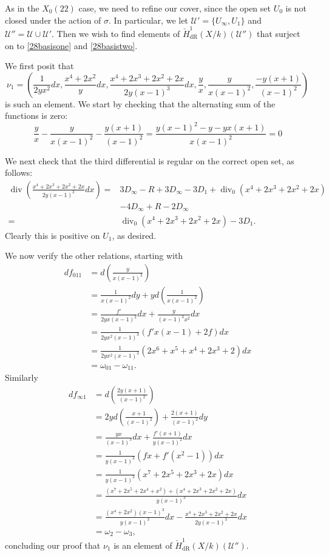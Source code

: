 \documentclass[draft, 11pt]{article} %
\theoremstyle{plain}
\theoremstyle{remark}
\newcommand{\cU}{{\mathcal U}}
\newcommand{\cechderhamhone}{\check{H}_{\text {dR}}^1(X/k)}
\DeclareMathOperator{\di}{div}
\begin{document}
As in the $X_0(22)$ case, we need to refine our cover, since the open set $U_0$ is not closed under the action of $\sigma$.
In particular, we let $\cU' = \{U_\infty, U_{1} \}$ and $\cU'' = \cU \cup \cU'$.
Then we wish to find elements of $\cechderhamhone(\cU'')$ that surject on to \eqref{28basisone} and \eqref{28basistwo}.

We first posit that
\[
\nu_1 = \left( \frac{1}{2yx^2}dx, \frac{x^4+2x^2}{y}dx, \frac{x^4 + 2x^3 + 2x^2 + 2x}{2y(x-1)^3}dx, \frac{y}{x}, \frac{y}{x(x-1)^2}, \frac{-y(x+1)}{(x-1)^2} \right)
\]
is such an element.
We start by checking that the alternating sum of the functions is zero:
\begin{equation*}
\frac{y}{x} - \frac{y}{x(x-1)^2} - \frac{y(x+1)}{(x-1)^2}  = \frac{y(x-1)^2 - y - yx(x+1)}{x(x-1)^2} = 0
\end{equation*}

We next check that the third differential is regular on the correct open set, as follows:
\begin{align*}
\di \left( \frac{x^4 + 2x^3 + 2x^2 + 2x}{2y(x-1)^3}dx \right) = & 3D_\infty -R +3D_\infty -3D_1 +\di_0(x^4+2x^3+2x^2+2x) \\
&  -4D_\infty +R -2D_\infty \\
= & \di_0(x^4 + 2x^3 + 2x^2 + 2x) - 3D_1.
\end{align*}
Clearly this is positive on $U_1$, as desired.

We now verify the other relations, starting with
\begin{align*}
df_{0 1 1} & = d \left( \frac{y}{x(x-1)^2} \right) \\
& = \frac{1}{x(x-1)^2}dy + y d \left( \frac{1}{x(x-1)^2} \right) \\
& = \frac{f'}{2yx(x-1)^2}dx + \frac{y}{(x-1)^3x^2}dx \\
& = \frac{1}{2yx^2(x-1)^3}\left( f'x(x-1) +2f\right)dx \\
& = \frac{1}{2yx^2(x-1)^3}(2x^6+x^5+x^4+2x^3+2)dx \\
& = \omega_{0 1} - \omega_{1 1}.
\end{align*}
Similarly
\begin{align*}
df_{\infty 1} & = d \left( \frac{2y(x+1)}{(x-1)^2} \right) \\
& = 2yd\left( \frac{x+1}{(x-1)^2} \right) + \frac{2(x+1)}{(x-1)^2}dy \\
& = \frac{yx}{(x-1)^3} dx + \frac{f'(x+1)}{y(x-1)^2}dx \\
& = \frac{1}{y(x-1)^3}(fx + f'(x^2-1))dx \\
& = \frac{1}{y(x-1)^3} (x^7 + 2x^5 + 2x^3 + 2x)dx \\
& = \frac{(x^7 + 2x^5 + 2x^4 +x^2) + (x^4 + 2x^3 + 2x^2 + 2x)}{y(x-1)^3} dx \\
& = \frac{(x^4+2x^2)(x-1)^3}{y(x-1)^3}dx - \frac{x^4+2x^3+2x^2+2x}{2y(x-1)^3}dx \\
& = \omega_2 - \omega_3,
\end{align*}
concluding our proof that $\nu_1$ is an element of $\cechderhamhone(\cU'')$.
\end{document}
